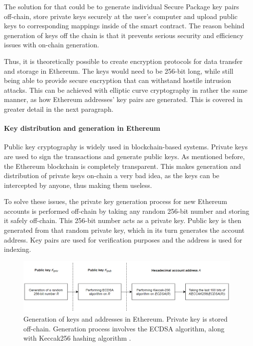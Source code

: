 The solution for that could be to generate individual Secure Package key pairs off-chain, store private keys securely at the user's computer and upload public keys to corresponding mappings inside of the smart contract. The reason behind generation of keys off the chain is that it prevents serious security and efficiency issues with on-chain generation.

Thus, it is theoretically possible to create encryption protocols for data transfer and storage in Ethereum. The keys would need to be 256-bit long, while still being able to provide secure encryption that can withstand hostile intrusion attacks. This can be achieved with elliptic curve cryptography in rather the same manner, as how Ethereum addresses' key pairs are generated. This is covered in greater detail in the next paragraph.

\paragraph{Key distribution and generation in Ethereum}
Public key cryptography is widely used in blockchain-based systems. Private keys are used to sign the transactions and generate public keys. As mentioned before, the Ethereum blockchain is completely transparent. This makes generation and distribution of private keys on-chain a very bad idea, as the keys can be intercepted by anyone, thus making them useless.

To solve these issues, the private key generation process for new Ethereum accounts is performed off-chain by taking any random 256-bit number and storing it safely off-chain. This 256-bit number acts as a private key. Public key is then generated from that random private key, which in its turn generates the account address. Key pairs are used for verification purposes and the address is used for indexing.

\begin{figure}[H]
\centering
\includegraphics[scale=0.62]{images/ethaddr.png}
\caption{Generation of keys and addresses in Ethereum. Private key is stored off-chain. Generation process involves the ECDSA algorithm, along with Keccak256 hashing algorithm \textnormal{\citep{ethyellow}}.}
\label{fig:keygenerationether}
\end{figure}

